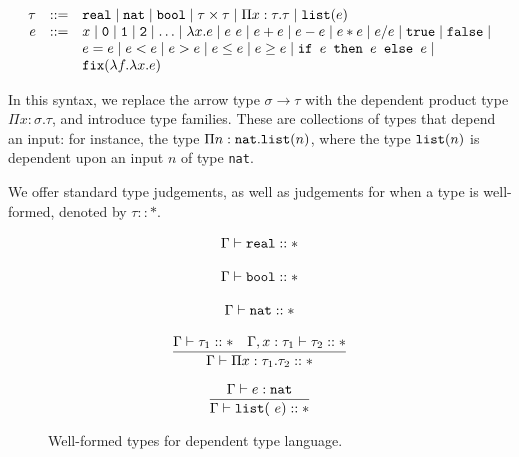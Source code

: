  \[
\begin{array}{rcl}
\tau &::=& \texttt{real} \mid \texttt{nat} \mid \texttt{bool} \mid \tau \times \tau \mid \Pi x:\tau.\tau
\mid \texttt{list}(e) \\
e &::=& x  \mid \texttt{0} \mid \texttt{1} \mid \texttt{2} \mid \dotsc \mid \lambda x.e \mid e \ e \mid e + e \mid e - e \mid  e  *  e \mid e / e \mid \texttt{true} \mid \texttt{false} \mid \\
  && e  =  e \mid e < e \mid e > e \mid e \leq e \mid e \geq e \mid 
     \texttt{if } e \texttt{ then } e \texttt{ else } e \mid \\
     && \texttt{fix}(\lambda f. \lambda x.e) 
\end{array}
\]

In this syntax, we replace the arrow type $\sigma \rightarrow \tau$ with the dependent product type
$\Pi x:\sigma.\tau$, and introduce type families. 
These are collections of types that depend an input: for instance,
the type $\Pi n:\texttt{nat}.\texttt{list}(n)$, where the type $\texttt{list}(n)$ is dependent upon an input $n$ of type \texttt{nat}.

We offer standard type judgements, as well as judgements for when a type is well-formed, denoted by $\tau :: *$. 

\begin{figure}
\[
\begin{array}{c}
\Gamma \vdash \texttt{real} :: * \\ \\
\Gamma \vdash \texttt{bool} :: *\\ \\
\Gamma \vdash \texttt{nat} :: * \\ \\ 
\dfrac{\Gamma \vdash \tau_1 :: * \ \ \ \Gamma, x:\tau_1 \vdash \tau_2 :: *}{\Gamma \vdash \Pi x:\tau_1.\tau_2 :: *} \\ \\
\dfrac{\Gamma \vdash e : \texttt{nat}}{\Gamma \vdash \texttt{list}(\ e) :: *} 
\end{array}
\]
\caption{Well-formed types for dependent type language.}
\end{figure}

